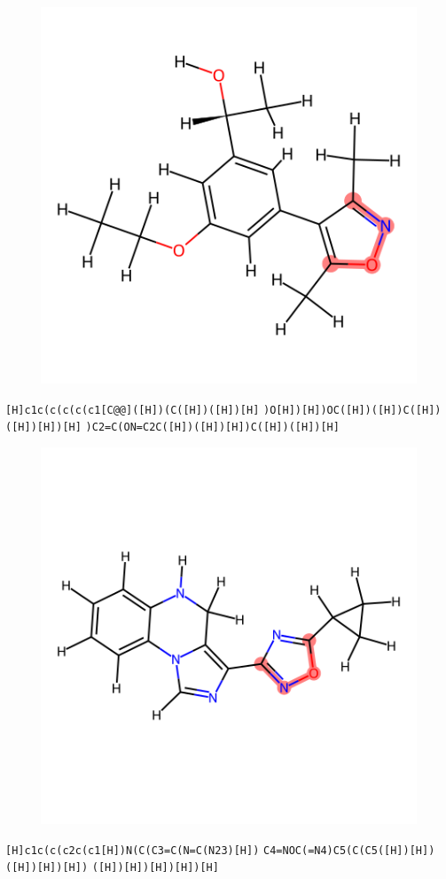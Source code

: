 \documentclass{article}
\begin{document}
\begin{figure}[ht]
\centering
    \includegraphics{mol182.png}
\end{figure}
\verb|[H]c1c(c(c(c(c1[C@@]([H])(C([H])([H])[H]| \verb|)O[H])[H])OC([H])([H])C([H])([H])[H])[H]| \verb|)C2=C(ON=C2C([H])([H])[H])C([H])([H])[H]|

\begin{figure}[ht]
\centering
    \includegraphics{mol183.png}
\end{figure}
\verb|[H]c1c(c(c2c(c1[H])N(C(C3=C(N=C(N23)[H])| \verb|C4=NOC(=N4)C5(C(C5([H])[H])([H])[H])[H])| \verb|([H])[H])[H])[H])[H]|
\end{document}
